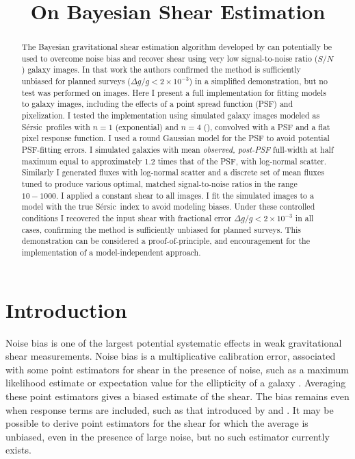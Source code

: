 \documentclass[12pt,preprint]{aastex}
\newcommand{\sn}{$S/N$}
\newcommand{\sersic}{S\'{e}rsic}
\begin{document}
\title{On Bayesian Shear Estimation}



\begin{abstract}

The Bayesian gravitational shear estimation algorithm developed by \cite{ba14}
can potentially be used to overcome noise bias and recover shear using very low
signal-to-noise ratio (\sn) galaxy images.  In that work the authors confirmed
the method is sufficiently unbiased for planned surveys ($\Delta g/g < 2 \times
10^{-3}$) in a simplified demonstration, but no test was performed on images.
Here I present a full implementation for fitting models to galaxy images,
including the effects of a point spread function (PSF) and pixelization.  I
tested the implementation using simulated galaxy images modeled as \sersic\
profiles with $n=1$ (exponential) and $n=4$ (\devauc), convolved with a PSF and
a flat pixel response function.  I used a round Gaussian model for the PSF to
avoid potential PSF-fitting errors. I simulated galaxies with mean {\it
observed, post-PSF} full-width at half maximum equal to approximately 1.2 times
that of the PSF, with log-normal scatter.  Similarly I generated fluxes with
log-normal scatter and a discrete set of mean fluxes tuned to produce various
optimal, matched signal-to-noise ratios in the range $10-1000$.  I applied a
constant shear to all images. I fit the simulated images to a model with the
true \sersic\ index to avoid modeling biases.   Under these controlled
conditions I recovered the input shear with fractional error $\Delta g/g < 2
\times 10^{-3}$ in all cases, confirming the method is sufficiently unbiased
for planned surveys.  This demonstration can be considered a
proof-of-principle, and encouragement for the implementation of a
model-independent approach.


\end{abstract}

\section{Introduction} \label{sec:intro}


Noise bias is one of the largest potential systematic effects in weak
gravitational shear measurements.  Noise bias is a multiplicative calibration
error, associated with some point estimators for shear in the presence of
noise, such as a maximum likelihood estimate or expectation value for the
ellipticity of a galaxy \citep{HirataAlign04,Refreg12,Melchior12,Miller13}.
Averaging these point estimators gives a biased estimate of the shear.  The
bias remains even when response terms are included, such as that introduced by
\cite{ksb95} and \cite{Bern02}. It may be possible to derive point estimators
for the shear for which the average is unbiased, even in the presence of large
noise, but no such estimator currently exists.
\end{document}

